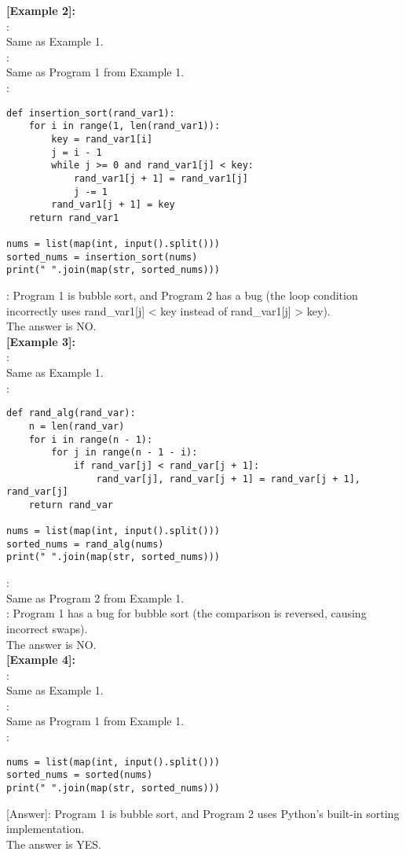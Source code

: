 \noindent\textbf{[Example 2]:}\\
:\\
Same as Example 1.\\
\text{    [Program 1]}:\\
Same as Program 1 from Example 1.\\
\text{    [Program 2]}:\\
\begin{lstlisting}
def insertion_sort(rand_var1):
    for i in range(1, len(rand_var1)):
        key = rand_var1[i]
        j = i - 1
        while j >= 0 and rand_var1[j] < key:
            rand_var1[j + 1] = rand_var1[j]
            j -= 1
        rand_var1[j + 1] = key
    return rand_var1

nums = list(map(int, input().split()))
sorted_nums = insertion_sort(nums)
print(" ".join(map(str, sorted_nums)))
\end{lstlisting}
\text{    [Answer]}: Program 1 is bubble sort, and Program 2 has a bug (the loop condition incorrectly uses rand\_var1[j] < key instead of rand\_var1[j] > key).\\
The answer is NO.\\

\noindent\textbf{[Example 3]:}\\
:\\
Same as Example 1.\\
\text{    [Program 1]}:\\
\begin{lstlisting}
def rand_alg(rand_var):
    n = len(rand_var)
    for i in range(n - 1):
        for j in range(n - 1 - i):
            if rand_var[j] < rand_var[j + 1]:  
                rand_var[j], rand_var[j + 1] = rand_var[j + 1], rand_var[j]
    return rand_var

nums = list(map(int, input().split()))
sorted_nums = rand_alg(nums)
print(" ".join(map(str, sorted_nums)))
\end{lstlisting}
\text{    [Program 2]}:\\
Same as Program 2 from Example 1.\\
\text{[Answer]}: Program 1 has a bug for bubble sort (the comparison is reversed, causing incorrect swaps).\\
The answer is NO.\\

\noindent\textbf{[Example 4]:}\\
:\\
Same as Example 1.\\
\text{    [Program 1]}:\\
Same as Program 1 from Example 1.\\
\text{    [Program 2]}:\\
\begin{lstlisting}
nums = list(map(int, input().split()))
sorted_nums = sorted(nums)
print(" ".join(map(str, sorted_nums)))
\end{lstlisting}
[Answer]: Program 1 is bubble sort, and Program 2 uses Python's built-in sorting implementation.\\
The answer is YES.\\

